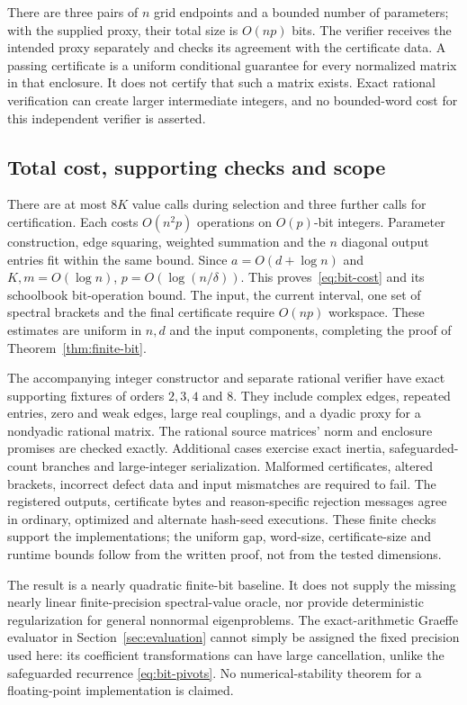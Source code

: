 There are three pairs of $n$ grid endpoints and a bounded number of
parameters; with the supplied proxy, their total size is $O(np)$
bits. The verifier receives the intended proxy separately and checks
its agreement with the certificate data. A passing certificate is a
uniform conditional guarantee for every normalized matrix in that
enclosure. It does not certify that such a matrix exists. Exact
rational verification can create larger intermediate integers, and
no bounded-word cost for this independent verifier is asserted.

\subsection{Total cost, supporting checks and scope}
\label{subsec:bit-cost-scope}

There are at most $8K$ value calls during selection and three further
calls for certification. Each costs $O(n^2p)$ operations on
$O(p)$-bit integers. Parameter construction, edge squaring, weighted
summation and the $n$ diagonal output entries fit within the same
bound. Since $a=O(d+\log n)$ and $K,m=O(\log n)$,
$p=O(\log(n/\delta))$. This proves~\eqref{eq:bit-cost} and its
schoolbook bit-operation bound. The input, the current interval,
one set of spectral brackets and the final certificate require
$O(np)$ workspace. These estimates are uniform in $n,d$ and the
input components, completing the proof of
Theorem~\ref{thm:finite-bit}.

The accompanying integer constructor and separate rational verifier
have exact supporting fixtures of orders $2,3,4$ and $8$.
They include complex edges, repeated entries, zero and weak edges,
large real couplings, and a dyadic proxy for a nondyadic rational
matrix. The rational source matrices' norm and enclosure promises
are checked exactly. Additional cases exercise exact inertia,
safeguarded-count branches and large-integer serialization.
Malformed certificates, altered brackets, incorrect defect data and
input mismatches are required to fail. The registered outputs,
certificate bytes and reason-specific rejection messages agree in
ordinary, optimized and alternate hash-seed executions. These finite
checks support the implementations; the uniform gap, word-size,
certificate-size and runtime bounds follow from the written proof,
not from the tested dimensions.

The result is a nearly quadratic finite-bit baseline. It does not
supply the missing nearly linear finite-precision spectral-value
oracle, nor provide deterministic regularization for general nonnormal
eigenproblems. The exact-arithmetic Graeffe evaluator
in Section~\ref{sec:evaluation} cannot simply be assigned the fixed
precision used here: its coefficient transformations can have large
cancellation, unlike the safeguarded recurrence
\eqref{eq:bit-pivots}. No numerical-stability theorem for a
floating-point implementation is claimed.

